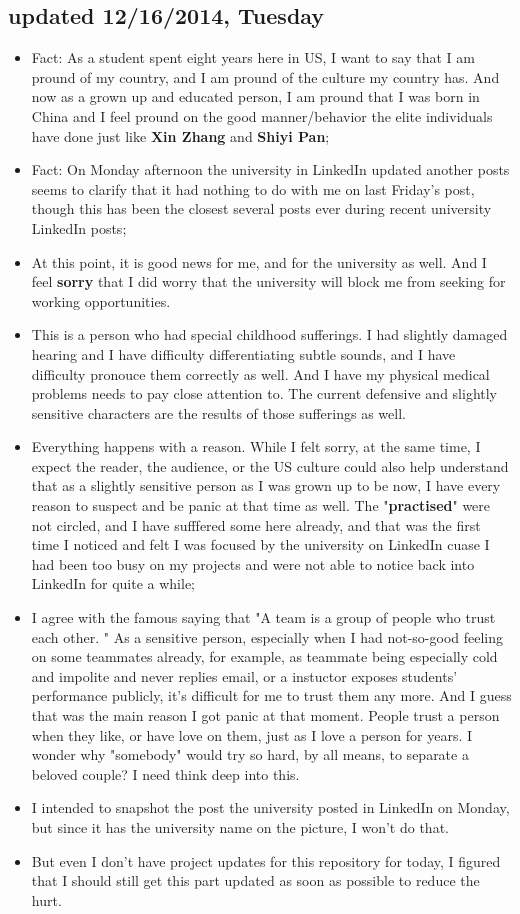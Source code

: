 \documentclass[9pt,b5paper]{article}
\begin{document}
\subsection{updated 12/16/2014, Tuesday}
\label{sec-9-2}
\begin{itemize}
\item Fact: As a student spent eight years here in US, I want to say that I am pround of my country, and I am pround of the culture my country has. And now as a grown up and educated person, I am pround that I was born in China and I feel pround on the good manner/behavior the elite individuals have done just like \textbf{Xin Zhang} and \textbf{Shiyi Pan};
\item Fact: On Monday afternoon the university in LinkedIn updated another posts seems to clarify that it had nothing to do with me on last Friday's post, though this has been the closest several posts ever during recent university LinkedIn posts;
\item At this point, it is good news for me, and for the university as well. And I feel \textbf{sorry} that I did worry that the university will block me from seeking for working opportunities.
\item This is a person who had special childhood sufferings. I had slightly damaged hearing and I have difficulty differentiating subtle sounds, and I have difficulty pronouce them correctly as well. And I have my physical medical problems needs to pay close attention to. The current defensive and slightly sensitive characters are the results of those sufferings as well.
\item Everything happens with a reason. While I felt sorry, at the same time, I expect the reader, the audience, or the US culture could also help understand that as a slightly sensitive person as I was grown up to be now, I have every reason to suspect and be panic at that time as well. The "\textbf{practised}" were not circled, and I have sufffered some here already, and that was the first time I noticed and felt I was focused by the university on LinkedIn cuase I had been too busy on my projects and were not able to notice back into LinkedIn for quite a while;
\item I agree with the famous saying that "A team is a group of people who trust each other. " As a sensitive person, especially when I had not-so-good feeling on some teammates already, for example, as teammate being especially cold and impolite and never replies email, or a instuctor exposes students' performance publicly, it's difficult for me to trust them any more. And I guess that was the main reason I got panic at that moment. People trust a person when they like, or have love on them, just as I love a person for years. I wonder why "somebody" would try so hard, by all means, to separate a beloved couple? I need think deep into this.
\item I intended to snapshot the post the university posted in LinkedIn on Monday, but since it has the university name on the picture, I won't do that.
\item But even I don't have project updates for this repository for today, I figured that I should still get this part updated as soon as possible to reduce the hurt.
\end{itemize}
\end{document}
